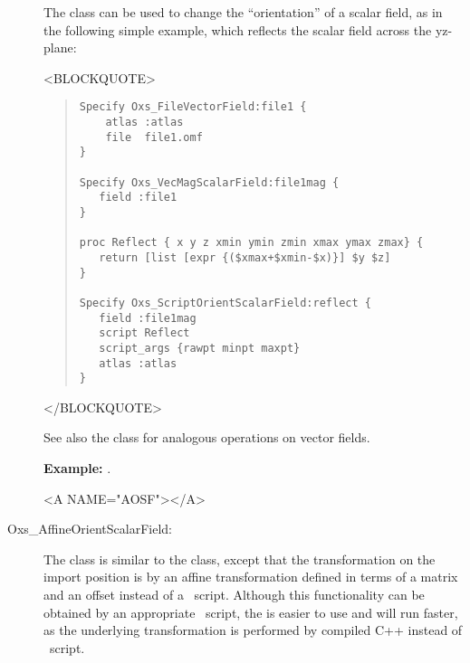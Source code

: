 \begin{description}
The  class can be used to change the
``orientation'' of a scalar field, as in the following simple example,
which reflects the  scalar field across the yz-plane:
\begin{rawhtml}<BLOCKQUOTE>\end{rawhtml}
\begin{quote}
\begin{verbatim}
Specify Oxs_FileVectorField:file1 {
    atlas :atlas
    file  file1.omf
}

Specify Oxs_VecMagScalarField:file1mag {
   field :file1
}

proc Reflect { x y z xmin ymin zmin xmax ymax zmax} {
   return [list [expr {($xmax+$xmin-$x)}] $y $z]
}

Specify Oxs_ScriptOrientScalarField:reflect {
   field :file1mag
   script Reflect
   script_args {rawpt minpt maxpt}
   atlas :atlas
}
\end{verbatim}
\end{quote}
\begin{rawhtml}</BLOCKQUOTE>\end{rawhtml}
See also the
class for
analogous operations on vector fields.

\textbf{Example:} .

\begin{rawhtml}<A NAME="AOSF"></A>\end{rawhtml}%
%
\item[Oxs\_AffineOrientScalarField:\label{item:AffineOrientScalarField}]
The  class is similar to the
 class, except that the transformation
on the import position is by an affine transformation defined in terms
of a  matrix and an offset instead of a
\Tcl\ script.  Although this functionality can be obtained by an
appropriate \Tcl\ script, the  is
easier to use and will run faster, as the underlying transformation is
performed by compiled C++ instead of \Tcl\ script.


\end{description}
